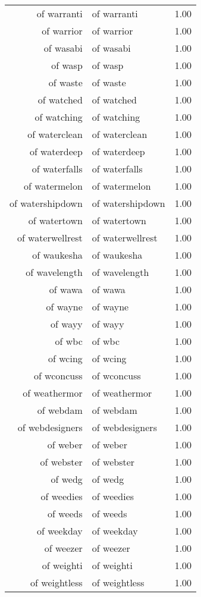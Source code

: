 \begin{table}[ht]
\begin{tabular}{rlr}
  of warranti & of warranti & 1.00 \\ 
  of warrior & of warrior & 1.00 \\ 
  of wasabi & of wasabi & 1.00 \\ 
  of wasp & of wasp & 1.00 \\ 
  of waste & of waste & 1.00 \\ 
  of watched & of watched & 1.00 \\ 
  of watching & of watching & 1.00 \\ 
  of waterclean & of waterclean & 1.00 \\ 
  of waterdeep & of waterdeep & 1.00 \\ 
  of waterfalls & of waterfalls & 1.00 \\ 
  of watermelon & of watermelon & 1.00 \\ 
  of watershipdown & of watershipdown & 1.00 \\ 
  of watertown & of watertown & 1.00 \\ 
  of waterwellrest & of waterwellrest & 1.00 \\ 
  of waukesha & of waukesha & 1.00 \\ 
  of wavelength & of wavelength & 1.00 \\ 
  of wawa & of wawa & 1.00 \\ 
  of wayne & of wayne & 1.00 \\ 
  of wayy & of wayy & 1.00 \\ 
  of wbc & of wbc & 1.00 \\ 
  of wcing & of wcing & 1.00 \\ 
  of wconcuss & of wconcuss & 1.00 \\ 
  of weathermor & of weathermor & 1.00 \\ 
  of webdam & of webdam & 1.00 \\ 
  of webdesigners & of webdesigners & 1.00 \\ 
  of weber & of weber & 1.00 \\ 
  of webster & of webster & 1.00 \\ 
  of wedg & of wedg & 1.00 \\ 
  of weedies & of weedies & 1.00 \\ 
  of weeds & of weeds & 1.00 \\ 
  of weekday & of weekday & 1.00 \\ 
  of weezer & of weezer & 1.00 \\ 
  of weighti & of weighti & 1.00 \\ 
  of weightless & of weightless & 1.00 \\ 

\end{tabular}
\end{table}
